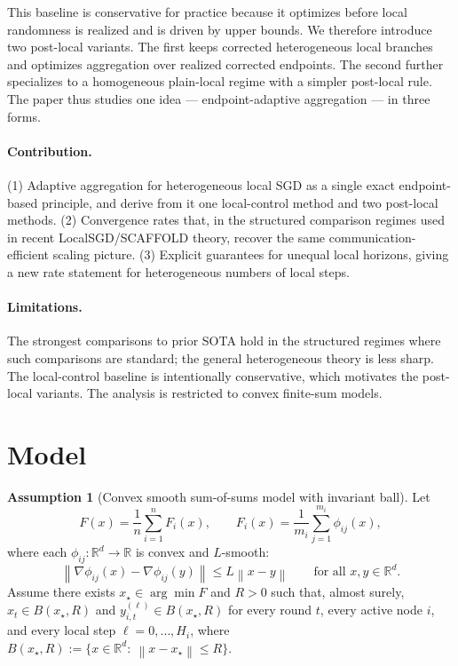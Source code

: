 \documentclass{article}
\theoremstyle{definition}
\newtheorem{assumption}[theorem]{Assumption}
\newcommand{\RR}{\mathbb R}
\newcommand{\norm}[1]{\left\lVert #1\right\rVert}
\begin{document}
This baseline is conservative for practice because it optimizes before local randomness is realized and is driven by upper bounds. We therefore introduce two post-local variants. The first keeps corrected heterogeneous local branches and optimizes aggregation over realized corrected endpoints. The second further specializes to a homogeneous plain-local regime with a simpler post-local rule. The paper thus studies one idea --- endpoint-adaptive aggregation --- in three forms.

\paragraph{Contribution.} (1) Adaptive aggregation for heterogeneous local SGD as a single exact endpoint-based principle, and derive from it one local-control method and two post-local methods. (2) Convergence rates that, in the structured comparison regimes used in recent LocalSGD/SCAFFOLD theory, recover the same communication-efficient scaling picture. (3) Explicit guarantees for unequal local horizons, giving a new rate statement for heterogeneous numbers of local steps.

\paragraph{Limitations.} The strongest comparisons to prior SOTA hold in the structured regimes where such comparisons are standard; the general heterogeneous theory is less sharp. The local-control baseline is intentionally conservative, which motivates the post-local variants. The analysis is restricted to convex finite-sum models.

\section{Model}

\begin{assumption}[Convex smooth sum-of-sums model with invariant ball]
Let
\begin{equation}
F(x)=\frac1n\sum_{i=1}^n F_i(x),\qquad F_i(x)=\frac1{m_i}\sum_{j=1}^{m_i}\phi_{ij}(x),
\label{eq:model}\end{equation}
where each $\phi_{ij}:\RR^d\to\RR$ is convex and $L$-smooth:
\[
\norm{\nabla \phi_{ij}(x)-\nabla \phi_{ij}(y)}\le L\norm{x-y}\qquad\text{for all }x,y\in\RR^d.
\]
Assume there exists $x_\star\in\arg\min F$ and $R>0$ such that, almost surely, $x_t\in B(x_\star,R)$ and $y_{i,t}^{(\ell)}\in B(x_\star,R)$
for every round $t$, every active node $i$, and every local step $\ell=0,\dots,H_i$, where $B(x_\star,R):=\{x\in\RR^d:\ \norm{x-x_\star}\le R\}$.
\end{assumption}
\end{document}
